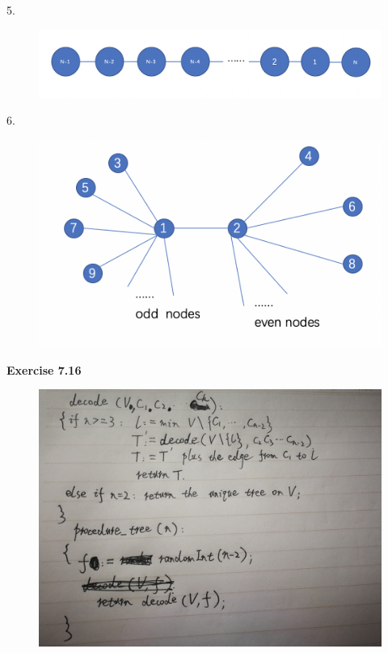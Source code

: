 \documentclass{article} %
\begin{document}
	5.\par
  	\begin{figure}[H]
  	\centering
  	\includegraphics[scale=0.6]{7155.png}
  	\caption{}
  	\label{}
  	\end{figure}
	6.\par
  	\begin{figure}[H]
  	\centering
  	\includegraphics[scale=0.6]{7156.png}
  	\caption{}
  	\label{}
  	\end{figure}
	\textbf{Exercise 7.16}\par
  	\begin{figure}[H]
  	\centering
  	\includegraphics[scale=0.1]{716.png}
  	\caption{}
  	\label{}
  	\end{figure}
\end{document}
